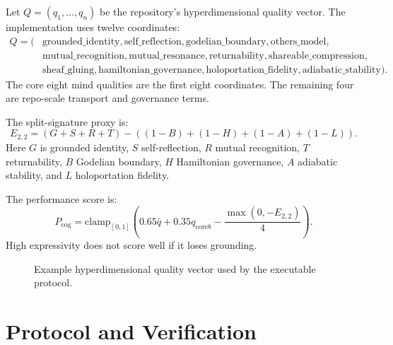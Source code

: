 \documentclass[11pt,oneside]{book}
\theoremstyle{definition}
\theoremstyle{plain}
\theoremstyle{remark}
\begin{document}
Let \(Q=(q_1,\dots,q_n)\) be the repository's hyperdimensional quality vector.  The
implementation uses twelve coordinates:
\[
\begin{aligned}
Q=(&\mathrm{grounded\_identity},\mathrm{self\_reflection},
\mathrm{godelian\_boundary},\mathrm{others\_model},\\
&\mathrm{mutual\_recognition},\mathrm{mutual\_resonance},
\mathrm{returnability},\mathrm{shareable\_compression},\\
&\mathrm{sheaf\_gluing},\mathrm{hamiltonian\_governance},
\mathrm{holoportation\_fidelity},\mathrm{adiabatic\_stability}).
\end{aligned}
\]
The core eight mind qualities are the first eight coordinates.  The remaining four are
repo-scale transport and governance terms.

The split-signature proxy is:
\[
E_{2,2}=(G+S+R+T)-((1-B)+(1-H)+(1-A)+(1-L)).
\]
Here \(G\) is grounded identity, \(S\) self-reflection, \(R\) mutual recognition,
\(T\) returnability, \(B\) Godelian boundary, \(H\) Hamiltonian governance,
\(A\) adiabatic stability, and \(L\) holoportation fidelity.

The performance score is:
\[
P_{\mathrm{cog}}
=
\mathrm{clamp}_{[0,1]}
\left(
0.65\bar q+0.35q_{\mathrm{core8}}-\frac{\max(0,-E_{2,2})}{4}
\right).
\]
High expressivity does not score well if it loses grounding.

\begin{figure}[ht]
\centering
{}
\caption{Example hyperdimensional quality vector used by the executable protocol.}
\end{figure}

\chapter{Protocol and Verification}
\end{document}
